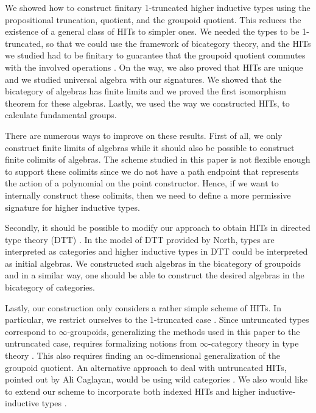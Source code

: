 We showed how to construct finitary 1-truncated higher inductive types using the propositional truncation, quotient, and the groupoid quotient.
This reduces the existence of a general class of HITs to simpler ones.
We needed the types to be 1-truncated, so that we could use the framework of bicategory theory,
and the HITs we studied had to be finitary to guarantee that the groupoid quotient
commutes with the involved operations \cite{DBLP:journals/mscs/ChapmanUV19}.
On the way, we also proved that HITs are unique and we studied universal algebra with our signatures.
We showed that the bicategory of algebras has finite limits and we proved the first isomorphism theorem for these algebras.
Lastly, we used the way we constructed HITs, to calculate fundamental groups.

There are numerous ways to improve on these results.
First of all, we only construct finite limits of algebras while it should also be possible to construct finite colimits of algebras.
The scheme studied in this paper is not flexible enough to support these colimits since we do not have a path endpoint that represents the action of a polynomial on the point constructor.
Hence, if we want to internally construct these colimits, then we need to define a more permissive signature for higher inductive types.

Secondly, it should be possible to modify our approach to obtain HITs in directed type theory (DTT) \cite{north2019towards}.
In the model of DTT provided by North, types are interpreted as categories and higher inductive types in DTT could be interpreted as initial algebras.
We constructed such algebras in the bicategory of groupoids and in a similar way, one should be able to construct the desired algebras in the bicategory of categories.

Lastly, our construction only considers a rather simple scheme of HITs.
In particular, we restrict ourselves to the 1-truncated case \cite{KaposiK18}.
Since untruncated types correspond to $\infty$-groupoids,
generalizing the methods used in this paper to the untruncated case,
requires formalizing notions from $\infty$-category theory in type theory
\cite{DBLP:conf/csl/AltenkirchR12,DBLP:journals/pacmpl/CapriottiK18,FinsterM17}.
This also requires finding an $\infty$-dimensional generalization of the groupoid quotient.
An alternative approach to deal with untruncated HITs, pointed out by Ali Caglayan,
would be using wild categories \cite{DBLP:conf/tlca/HirschowitzHT15,KrausRaumer}.
We also would like to extend our scheme to incorporate both indexed HITs and higher inductive-inductive types \cite{CavalloH19,KaposiK18}.